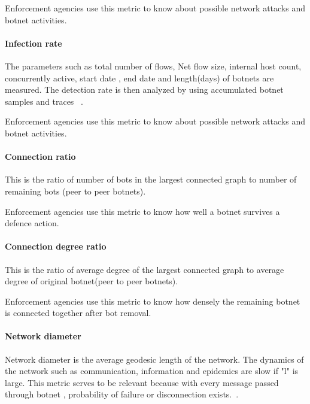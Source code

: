Enforcement agencies use this metric to know about possible network attacks and botnet activities.



\paragraph{ Infection rate }

The  parameters such as total number of flows, Net flow size, internal host count, concurrently  active, start date , end date and length(days) of botnets are measured. The detection rate is then analyzed by using accumulated botnet samples and traces ~\cite{haltas2014automated}.

Enforcement agencies use this metric to know about possible network attacks and botnet activities.

\paragraph{ Connection ratio }

This is the ratio of number of bots in the largest connected graph to number of remaining bots (peer to peer botnets).

Enforcement agencies use this metric to know how well a botnet survives a defence action.

\paragraph{ Connection degree ratio }

This is the ratio of average degree of the largest connected graph to average degree of original botnet(peer to peer botnets).

Enforcement agencies use this metric to know how densely the remaining botnet is connected together after bot removal.

\paragraph{ Network diameter }

Network diameter is the average geodesic length of the network.  The dynamics of the network such as communication, information and epidemics are slow if "l" is large. This metric serves to be relevant  because  with every message passed through botnet , probability of failure or disconnection exists.~\cite{Strayer08botnetdetection}.

